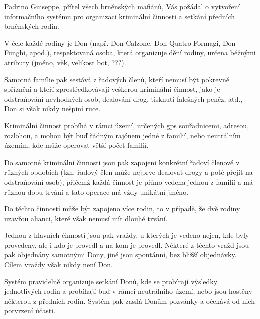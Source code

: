 \documentclass{article}
\begin{document}
\large Padrino Guiseppe, přítel všech brněnských mafiánů, Vás požádal o vytvoření informačního systému pro organizaci kriminální činnosti a setkání předních brněnských rodin. 
\par V čele každé rodiny je Don (např. Don Calzone, Don Quatro Formagi, Don Funghi, apod.), respektovaná osoba, která organizuje dění rodiny, určena běžnými atributy (jméno, věk, velikost bot, ???). 
\par Samotná famílie pak sestává z řadových členů, kteří nemusí být pokrevně spřízněni a kteří zprostředkovávají veškerou kriminální činnost, jako je odstraňování nevhodných osob, dealování drog, tisknutí falešných peněz, atd., Don si však nikdy nešpiní ruce. 
\par Kriminální činnost probíhá v rámci území, určených gps souřadnicemi, adresou, rozlohou, a mohou být buď řádným rajónem jedné z familií, nebo neutrálním územím, kde může operovat větší počet familií. 
\par Do samotné kriminální činnosti jsou pak zapojeni konkrétní řadoví členové v různých obdobích (tzn. řadový člen může nejprve dealovat drogy a poté přejít na odstraňování osob), přičemž každá činnost je přímo vedena jednou z familií a má různou dobu trvání a tato operace má vždy unikátní jméno. 
\par Do těchto činností může být zapojeno více rodin, to v případě, že dvě rodiny uzavřou alianci, které však nemusí mít dlouhé trvání. 
\par Jednou z hlavních činností jsou pak vraždy, u kterých je vedeno nejen, kde byly provedeny, ale i kdo je provedl a na kom je provedl. Některé z těchto vražd jsou pak objednány samotnými Dony, jiné jsou spontánní, bez bližší objednávky. Cílem vraždy však nikdy není Don. 
\par Systém pravidelně organizuje setkání Donů, kde se probírají výsledky jednotlivých rodin a probíhají buď v rámci neutrálního území, nebo jsou hostěny některou z předních rodin. Systém pak zasílá Donům pozvánky a očekává od nich potvrzení účasti.

\newpage
\end{document}
